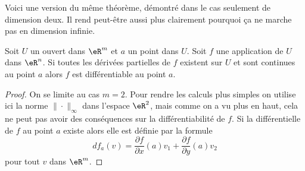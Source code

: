 Voici une version du même théorème, démontré dans le cas seulement de dimension deux. Il rend peut-être aussi plus clairement pourquoi ça ne marche pas en dimension infinie.

\begin{proposition}		\label{Diff_totale}     %
	Soit \( U\) un ouvert dans \( \eR^m\) et \( a\) un point dans \( U\). Soit \( f\) une application de \( U\) dans \( \eR^n\). Si toutes les dérivées partielles de \( f\) existent sur \( U\) et sont continues au point \( a\) alors \( f\) est différentiable au point \( a\).
\end{proposition}

\begin{proof}
	On se limite au cas \( m=2\).  Pour rendre les calculs plus simples on utilise ici la norme \( \|\cdot\|_\infty\) dans l'espace \( \eR^2\), mais comme on a vu plus en haut, cela ne peut pas avoir des conséquences sur la différentiabilité de \( f\). Si la différentielle de \( f\) au point \( a\) existe alors elle est définie par la formule
	\[
		df_a(v)=\frac{ \partial f }{ \partial x }(a)v_1+\frac{ \partial f }{ \partial y }(a)v_2
	\]
	pour tout \( v\) dans \( \eR^m\).


\end{proof}
